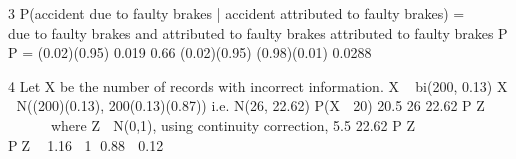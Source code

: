\documentclass[a4paper,12pt]{article}
\begin{document}
3 P(accident due to faulty brakes | accident attributed to faulty brakes)
=  
 
due to faulty brakes and attributed to faulty brakes
attributed to faulty brakes
P
P
= (0.02)(0.95) 0.019 0.66
(0.02)(0.95) (0.98)(0.01) 0.0288
 


4 Let X be the number of records with incorrect information.
X ~ bi(200, 0.13)
X  N((200)(0.13), 200(0.13)(0.87))
i.e. N(26, 22.62)
P(X  20)
20.5 26
22.62
P Z
  
   
 	
where Z  N(0,1), using continuity correction,
5.5
22.62
P Z
  
   
 	
 PZ  1.16 1 0.88  0.12
\end{document}
